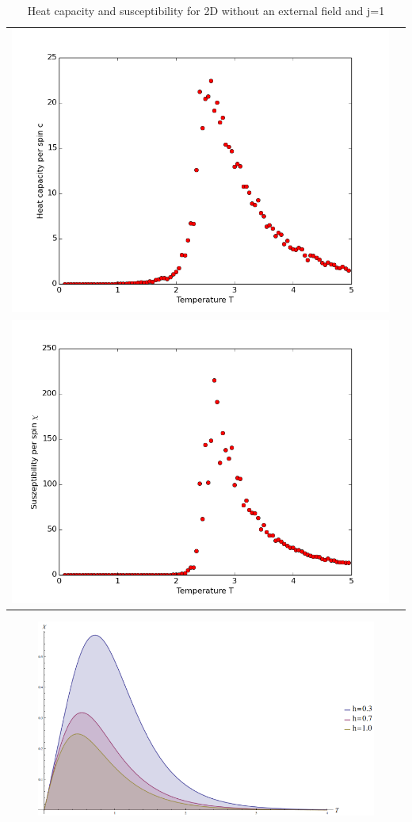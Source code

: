\documentclass[12pt,a4paper,titlepage]{article}
\begin{document}
\begin{table}
\centering
\begin{tabular}{cc}
\includegraphics[width=13cm]{Plots/Heat_Capacitiy_2}\\
\includegraphics[width=13cm]{Plots/Suszeptibility_2} \\
\end{tabular} 
\caption{Heat capacity and susceptibility for 2D without an external field and j=1}
\end{table}





\begin{figure}
	\includegraphics[width=\linewidth]{Plots/spin1dh}
\end{figure}
\end{document}
